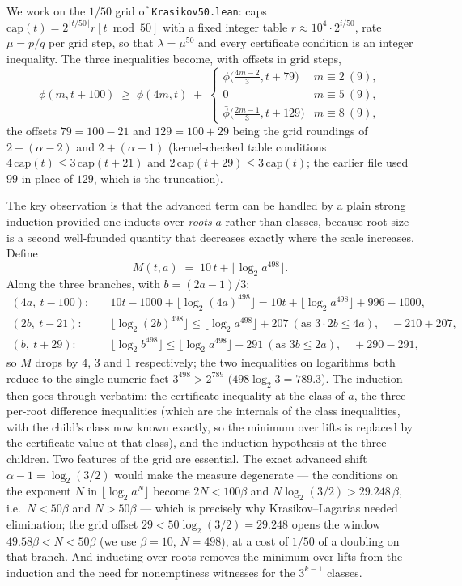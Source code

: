\documentclass[11pt]{article}
\newcommand{\code}[1]{\texttt{#1}}
\begin{document}
We work on the $1/50$ grid of \code{Krasikov50.lean}: caps
$\mathrm{cap}(t) = 2^{\lfloor t/50\rfloor} r[t \bmod 50]$ with a fixed
integer table $r \approx 10^4 \cdot 2^{i/50}$, rate $\mu = p/q$ per
grid step, so that $\lambda = \mu^{50}$ and every certificate
condition is an integer inequality. The three inequalities become,
with offsets in grid steps,
\[
\phi(m, t+100) \;\ge\; \phi(4m, t) \;+\;
\begin{cases}
\bar\phi\big(\tfrac{4m-2}{3}, t + 79\big) & m \equiv 2\ (9),\\[2pt]
0 & m \equiv 5\ (9),\\[2pt]
\bar\phi\big(\tfrac{2m-1}{3}, t + 129\big) & m \equiv 8\ (9),
\end{cases}
\]
the offsets $79 = 100 - 21$ and $129 = 100 + 29$ being the grid
roundings of $2 + (\alpha - 2)$ and $2 + (\alpha - 1)$ (kernel-checked
table conditions $4\,\mathrm{cap}(t) \le 3\,\mathrm{cap}(t+21)$ and
$2\,\mathrm{cap}(t+29) \le 3\,\mathrm{cap}(t)$; the earlier file used
$99$ in place of $129$, which is the truncation).

The key observation is that the advanced term can be handled by a
plain strong induction provided one inducts over \emph{roots} $a$
rather than classes, because root size is a second well-founded
quantity that decreases exactly where the scale increases. Define
\[
M(t, a) \;=\; 10\,t + \lfloor \log_2 a^{498} \rfloor .
\]
Along the three branches, with $b = (2a-1)/3$:
\begin{align*}
(4a,\ t-100):&\quad 10t - 1000 + \lfloor\log_2 (4a)^{498}\rfloor
  = 10t + \lfloor\log_2 a^{498}\rfloor + 996 - 1000,\\
(2b,\ t-21):&\quad \lfloor\log_2 (2b)^{498}\rfloor \le
  \lfloor\log_2 a^{498}\rfloor + 207 \ (\text{as } 3\cdot 2b \le 4a),
  \quad -210 + 207,\\
(b,\ t+29):&\quad \lfloor\log_2 b^{498}\rfloor \le
  \lfloor\log_2 a^{498}\rfloor - 291 \ (\text{as } 3b \le 2a),
  \quad +290 - 291,
\end{align*}
so $M$ drops by $4$, $3$ and $1$ respectively; the two inequalities on
logarithms both reduce to the single numeric fact $3^{498} > 2^{789}$
($498 \log_2 3 = 789.3$). The induction then goes through verbatim:
the certificate inequality at the class of $a$, the three per-root
difference inequalities (which are the internals of the class
inequalities, with the child's class now known exactly, so the minimum
over lifts is replaced by the certificate value at that class), and
the induction hypothesis at the three children. Two features of the
grid are essential. The exact advanced shift $\alpha - 1 =
\log_2(3/2)$ would make the measure degenerate --- the conditions on
the exponent $N$ in $\lfloor \log_2 a^N\rfloor$ become $2N < 100\beta$
and $N \log_2(3/2) > 29.248\,\beta$, i.e.\ $N < 50\beta$ and $N >
50\beta$ --- which is precisely why Krasikov--Lagarias needed
elimination; the grid offset $29 < 50\log_2(3/2) = 29.248$ opens the
window $49.58\beta < N < 50\beta$ (we use $\beta = 10$, $N = 498$), at
a cost of $1/50$ of a doubling on that branch. And inducting over
roots removes the minimum over lifts from the induction and the need
for nonemptiness witnesses for the $3^{k-1}$ classes.
\end{document}
